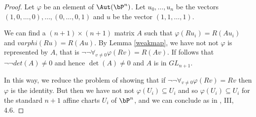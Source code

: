 \begin{proof}
  Let $\varphi$ be an element of $\Aut(\bP^n)$.
  Let $u_0,\dots,u_n$ be the vectors $(1,0,\dots,0), \dots, (0,\dots,0,1)$
  and $u$ be the vector $(1,1,\dots,1)$.

  We can find a $(n+1)\times (n+1)$ matrix $A$ such that $\varphi(R u_i) = R (Au_i)$
  and $varphi(R u) = R (A u)$. By Lemma \ref{weakmap}, we have not not $\varphi$ is represented by $A$,
  that is $\neg\neg \forall_{v\neq 0}\varphi(R v) = R (Av)$. If follows that $\neg \neg det(A) \neq 0$
  and hence $\det(A)\neq 0$ and $A$ is in $GL_{n+1}$.

  In this way, we reduce the problem of showing that if $\neg\neg \forall_{v\neq 0}\varphi (R v) = R v$
  then $\varphi$ is the identity. But then we have not not $\varphi(U_i)\subseteq U_i$
  and so $\varphi(U_i)\subseteq U_i$ for the standard $n+1$ affine charts $U_i$ of $\bP^n$, and we can
  conclude as in \cite{Demazure}, III, 4.6.
\end{proof}
